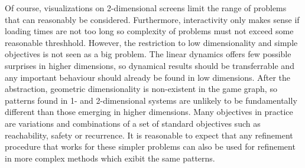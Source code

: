 Of course, visualizations on 2-dimensional screens limit the range of problems that can reasonably be considered.
Furthermore, interactivity only makes sense if loading times are not too long so complexity of problems must not exceed some reasonable threshhold.
However, the restriction to low dimensionality and simple objectives is not seen as a big problem.
The linear dynamics offers few possible surprises in higher dimensions, so dynamical results should be transferrable and any important behaviour should already be found in low dimensions.
After the abstraction, geometric dimensionality is non-existent in the game graph, so patterns found in 1- and 2-dimensional systems are unlikely to be fundamentally different than those emerging in higher dimensions.
Many objectives in practice are variations and combinations of a set of standard objectives such as reachability, safety or recurrence.
It is reasonable to expect that any refinement procedure that works for these simpler problems can also be used for refinement in more complex methods which exibit the same patterns.

